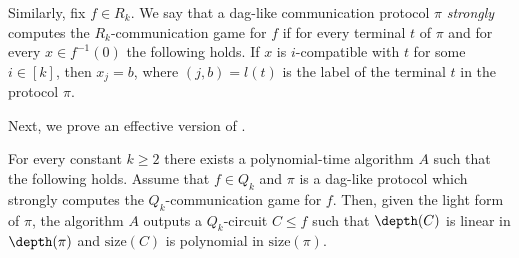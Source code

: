 Similarly, fix $f\in R_k$. We say that a dag-like communication protocol $\pi$ \emph{strongly} computes the $R_k$-communication game for $f$ if for every terminal $t$ of $\pi$ and for every $x\in f^{-1}(0)$ the following holds. If $x$ is $i$-compatible with $t$ for some $i\in [k]$, then $x_j = b$, where $(j, b) = l(t)$ is the label of the terminal $t$ in the protocol $\pi$.



Next, we prove an effective version of .
\begin{theorem}
\label{efficient_Q_k}
For every constant $k\ge 2$ there exists  a polynomial-time algorithm $A$ such that the following holds. Assume that $f\in Q_k$ and $\pi$ is a dag-like protocol which strongly computes  the $Q_k$-communication game for $f$. Then, given the light form of $\pi$, the algorithm $A$ outputs a $Q_k$-circuit $C \le f$ such that $\depth(C)$ is linear in $\depth(\pi)$ and $\mathrm{size}(C)$ is polynomial in $\mathrm{size}(\pi)$. 
\end{theorem}
